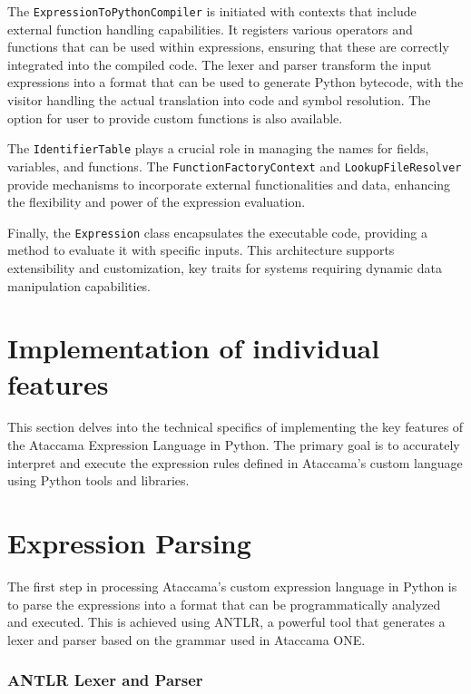 The \texttt{ExpressionToPythonCompiler} is initiated with contexts that include external function handling capabilities. It registers various operators and functions that can be used within expressions, ensuring that these are correctly integrated into the compiled code. The lexer and parser transform the input expressions into a format that can be used to generate Python bytecode, with the visitor handling the actual translation into code and symbol resolution. The option for user to provide custom functions is also available.

The \texttt{IdentifierTable} plays a crucial role in managing the names for fields, variables, and functions. The \texttt{FunctionFactoryContext} and
\texttt{LookupFileResolver} provide mechanisms to incorporate external functionalities and data, enhancing the flexibility and power of the expression evaluation.

Finally, the \texttt{Expression} class encapsulates the executable code, providing a method to evaluate it with specific inputs. This architecture supports extensibility and customization, key traits for systems requiring dynamic data manipulation capabilities.

\section{Implementation of individual features}

This section delves into the technical specifics of implementing the key features of the Ataccama Expression Language in Python. The primary goal is to accurately interpret and execute the expression rules defined in Ataccama's custom language using Python tools and libraries.

\section{Expression Parsing}

The first step in processing Ataccama’s custom expression language in Python is to parse the expressions into a format that can be programmatically analyzed and executed. This is achieved using ANTLR, a powerful tool that generates a lexer and parser based on the grammar used in Ataccama ONE.

\subsubsection{ANTLR Lexer and Parser}

